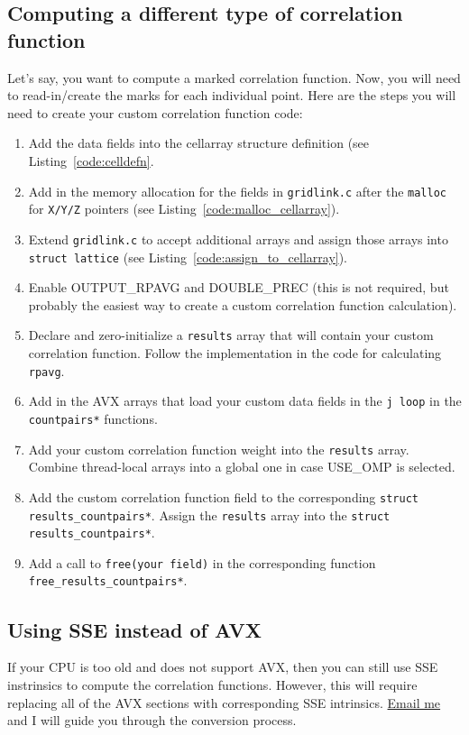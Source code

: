 \documentclass[12pt,titlepage,justified]{article}
\begin{document}
\subsection{Computing a different type of correlation function}
Let's say, you want to compute a marked correlation function. Now, you will need to read-in/create the marks for each individual point. Here are the steps 
you will need to create your custom correlation function code:
\begin{enumerate}
\item Add the data fields into the cellarray structure definition (see Listing~\ref{code:celldefn}.
\item Add in the memory allocation for the fields in \texttt{gridlink.c} after the \texttt{malloc} for \texttt{X/Y/Z} pointers (see Listing~\ref{code:malloc_cellarray}).
\item Extend \texttt{gridlink.c} to accept additional arrays and assign those arrays into \texttt{struct lattice} (see Listing~\ref{code:assign_to_cellarray}).
\item Enable OUTPUT\_RPAVG and DOUBLE\_PREC (this is not required, but probably the easiest way to create a custom correlation function calculation).
\item Declare and zero-initialize a \texttt{results} array that will contain your custom correlation function. Follow the implementation in the code for calculating \texttt{rpavg}.
\item Add in the AVX arrays that load your custom data fields in the \texttt{j loop} in the \texttt{countpairs*} functions.
\item Add your custom correlation function weight into the \texttt{results} array. Combine thread-local arrays into a global one in case USE\_OMP is selected. 
\item Add the custom correlation function field to the corresponding \texttt{struct results\_countpairs*}. Assign the \texttt{results} array into the \texttt{struct results\_countpairs*}.
\item Add a call to \texttt{free(your field)} in the corresponding function \texttt{free\_results\_countpairs*}.
\end{enumerate}

\subsection{Using SSE instead of AVX}
If your CPU is too old and does not support AVX, then you can still use SSE instrinsics to compute the correlation functions. However, this will require replacing all of the 
AVX sections with corresponding SSE intrinsics. \href{mailto:manodeep@gmail.com}{Email me} and I will guide you through the conversion process. 
\end{document}
